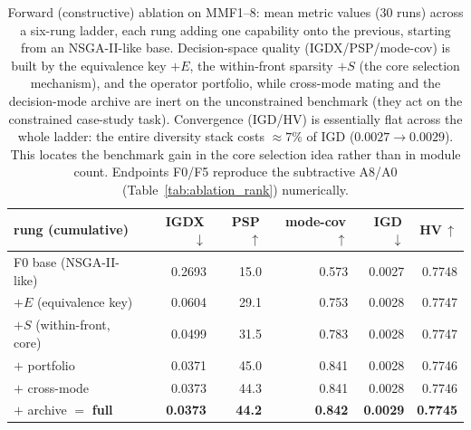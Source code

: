 \begin{table}[t]
\centering\small
\caption{Forward (constructive) ablation on MMF1--8: mean metric values ($30$ runs) across a six-rung ladder, each rung adding one capability onto the previous, starting from an NSGA-II-like base. Decision-space quality (IGDX/PSP/mode-cov) is built by the equivalence key $+E$, the within-front sparsity $+S$ (the core selection mechanism), and the operator portfolio, while cross-mode mating and the decision-mode archive are inert on the unconstrained benchmark (they act on the constrained case-study task). Convergence (IGD/HV) is essentially flat across the whole ladder: the entire diversity stack costs $\approx 7\%$ of IGD ($0.0027\!\to\!0.0029$). This locates the benchmark gain in the core selection idea rather than in module count. Endpoints F0/F5 reproduce the subtractive A8/A0 (Table~\ref{tab:ablation_rank}) numerically.}
\label{tab:forward_ablation}
\begin{tabular}{lrrrrr}
\toprule
rung (cumulative) & IGDX\,$\downarrow$ & PSP\,$\uparrow$ & mode-cov\,$\uparrow$ & IGD\,$\downarrow$ & HV\,$\uparrow$ \\
\midrule
F0 base (NSGA-II-like) & 0.2693 & 15.0 & 0.573 & 0.0027 & 0.7748 \\
\;\;$+E$ (equivalence key) & 0.0604 & 29.1 & 0.753 & 0.0028 & 0.7747 \\
\;\;$+S$ (within-front, core) & 0.0499 & 31.5 & 0.783 & 0.0028 & 0.7747 \\
\;\;$+$ portfolio & 0.0371 & 45.0 & 0.841 & 0.0028 & 0.7746 \\
\;\;$+$ cross-mode & 0.0373 & 44.3 & 0.841 & 0.0028 & 0.7746 \\
\;\;$+$ archive $=$ \textbf{full} & \textbf{0.0373} & \textbf{44.2} & \textbf{0.842} & \textbf{0.0029} & \textbf{0.7745} \\
\bottomrule
\end{tabular}
\end{table}
